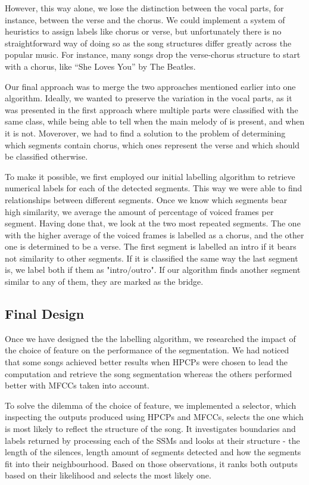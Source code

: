 However, this way alone, we lose the distinction between the vocal parts, for instance, between the verse and the chorus. We could implement a system of heuristics to assign labels like chorus or verse, but unfortunately there is no straightforward way of doing so as the song structures differ greatly across the popular music. For instance, many songs drop the verse-chorus structure to start with a chorus, like ``She Loves You'' by The Beatles.

Our final approach was to merge the two approaches mentioned earlier into one algorithm. Ideally, we wanted to preserve the variation in the vocal parts, as it was presented in the first approach where multiple parts were classified with the same class, while being able to tell when the main melody of is present, and when it is not. Moverover, we had to find a solution to the problem of determining which segments contain chorus, which ones represent the verse and which should be classified otherwise.


To make it possible, we first employed our initial labelling algorithm to retrieve numerical labels for each of the detected segments. This way we were able to find relationships between different segments. Once we know which segments bear high similarity, we average the amount of percentage of voiced frames per segment. Having done that, we look at the two most repeated segments. The one with the higher average of the voiced frames is labelled as a chorus, and the other one is determined to be a verse. The first segment is labelled an intro if it bears not similarity to other segments. If it is classified the same way the last segment is, we label both if them as "intro/outro". If our algorithm finds another segment similar to any of them, they are marked as the bridge.

\vspace{10pt}


\subsection{Final Design}

Once we have designed the the labelling algorithm, we researched the impact of the choice of feature on the performance of the segmentation. We had noticed that some songs achieved better results when HPCPs were chosen to lead the computation and retrieve the song segmentation whereas the others performed better with MFCCs taken into account. 

To solve the dilemma of the choice of feature, we implemented a selector, which inspecting the outputs produced using HPCPs and MFCCs, selects the one which is most likely to reflect the structure of the song. It investigates boundaries and labels returned by processing each of the SSMs and looks at their structure - the length of the silences, length amount of segments detected and how the segments fit into their neighbourhood. Based on those observations, it ranks both outputs based on their likelihood and selects the most likely one. 


